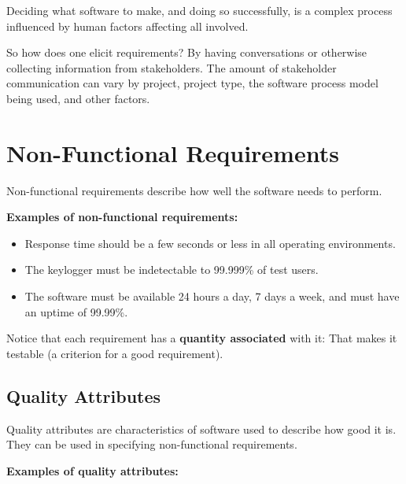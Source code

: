 Deciding what software to make, and doing so successfully, is a complex process influenced by human factors affecting all involved.

So how does one elicit requirements? By having conversations or otherwise collecting information from stakeholders. The amount of stakeholder communication can vary by project, project type, the software process model being used, and other factors.

\section{Non-Functional Requirements}

\marginpar{\nonFunctionalRequirementDef}Non-functional requirements describe how well the software needs to perform.

\spacer
\noindent\textbf{Examples of non-functional requirements:}\\

\begin{itemize}
\item Response time should be a few seconds or less in all operating environments.\\
\item The keylogger must be indetectable to 99.999\% of test users.\\
\item The software must be available 24 hours a day, 7 days a week, and must have an uptime of 99.99\%.\\
\end{itemize}

Notice that each requirement has a \textbf{quantity associated} with it: That makes it testable (a criterion for a good requirement).

\subsection{Quality Attributes}

\marginpar{\qualityAttributeDef}Quality attributes are characteristics of software used to describe how good it is. They can be used in specifying non-functional requirements.

\spacer
\noindent\textbf{Examples of quality attributes:}\\

